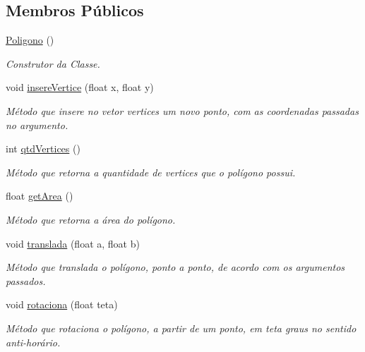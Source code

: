 \subsection*{Membros Públicos}
\begin{DoxyCompactItemize}
\item 
\mbox{\label{classPoligono_a9311a9a1496878c09c8508b3636e2870}} 
\mbox{\hyperlink{classPoligono_a9311a9a1496878c09c8508b3636e2870}{Poligono}} ()
\begin{DoxyCompactList}\small\item\em Construtor da Classe. \end{DoxyCompactList}\item 
void \mbox{\hyperlink{classPoligono_aeaad76667207d96ea0d69c2dfb3bc2a9}{insere\+Vertice}} (float x, float y)
\begin{DoxyCompactList}\small\item\em Método que insere no vetor \textquotesingle{}vertices\textquotesingle{} um novo ponto, com as coordenadas passadas no argumento. \end{DoxyCompactList}\item 
int \mbox{\hyperlink{classPoligono_ae2c1c915b4a72104724d1302138e7caa}{qtd\+Vertices}} ()
\begin{DoxyCompactList}\small\item\em Método que retorna a quantidade de vertices que o polígono possui. \end{DoxyCompactList}\item 
float \mbox{\hyperlink{classPoligono_ab1a85a090e7442bf3151602b05da9e19}{get\+Area}} ()
\begin{DoxyCompactList}\small\item\em Método que retorna a área do polígono. \end{DoxyCompactList}\item 
void \mbox{\hyperlink{classPoligono_adbf605dfd0419b7301c9be0ec1dbe41b}{translada}} (float a, float b)
\begin{DoxyCompactList}\small\item\em Método que translada o polígono, ponto a ponto, de acordo com os argumentos passados. \end{DoxyCompactList}\item 
void \mbox{\hyperlink{classPoligono_a937c0e2bec60140fcc7b7bde5d64d339}{rotaciona}} (float teta)
\begin{DoxyCompactList}\small\item\em Método que rotaciona o polígono, a partir de um ponto, em teta graus no sentido anti-\/horário. \end{DoxyCompactList}\item 

\end{DoxyCompactItemize}
